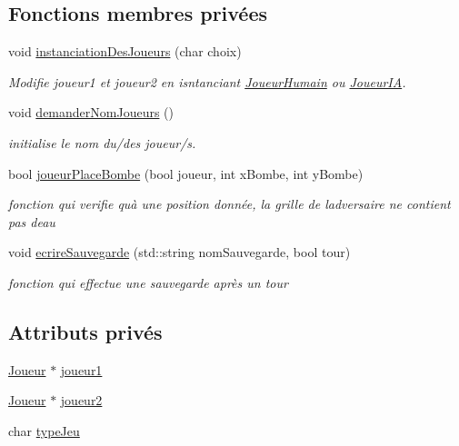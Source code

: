 \subsection*{Fonctions membres privées}
\begin{DoxyCompactItemize}
\item 
void \hyperlink{class_jeu_bataille_navale_a96f8b9a6d42db7e505e0046ad78b71cc}{instanciation\+Des\+Joueurs} (char choix)
\begin{DoxyCompactList}\small\item\em Modifie joueur1 et joueur2 en isntanciant \hyperlink{class_joueur_humain}{Joueur\+Humain} ou \hyperlink{class_joueur_i_a}{Joueur\+IA}. \end{DoxyCompactList}\item 
void \hyperlink{class_jeu_bataille_navale_a00065487788bcf1a3b5689138a688b13}{demander\+Nom\+Joueurs} ()\hypertarget{class_jeu_bataille_navale_a00065487788bcf1a3b5689138a688b13}{}\label{class_jeu_bataille_navale_a00065487788bcf1a3b5689138a688b13}

\begin{DoxyCompactList}\small\item\em initialise le nom du/des joueur/s. \end{DoxyCompactList}\item 
bool \hyperlink{class_jeu_bataille_navale_aeed25ee4552993ad95a478f5925cca79}{joueur\+Place\+Bombe} (bool joueur, int x\+Bombe, int y\+Bombe)
\begin{DoxyCompactList}\small\item\em fonction qui verifie qu\textquotesingle{}à une position donnée, la grille de l\textquotesingle{}adversaire ne contient pas d\textquotesingle{}eau \end{DoxyCompactList}\item 
void \hyperlink{class_jeu_bataille_navale_a4357f800dc81be128c5b40067f71fe4f}{ecrire\+Sauvegarde} (std\+::string nom\+Sauvegarde, bool tour)
\begin{DoxyCompactList}\small\item\em fonction qui effectue une sauvegarde après un tour \end{DoxyCompactList}\end{DoxyCompactItemize}
\subsection*{Attributs privés}
\begin{DoxyCompactItemize}
\item 
\hyperlink{class_joueur}{Joueur} $\ast$ \hyperlink{class_jeu_bataille_navale_a74843e77b779a96f41de250f075abfe0}{joueur1}
\item 
\hyperlink{class_joueur}{Joueur} $\ast$ \hyperlink{class_jeu_bataille_navale_a9b93aca9dd777873c307842a7e753dab}{joueur2}
\item 
char \hyperlink{class_jeu_bataille_navale_abac1f29d41caf119a9766f323506dbe0}{type\+Jeu}
\end{DoxyCompactItemize}


